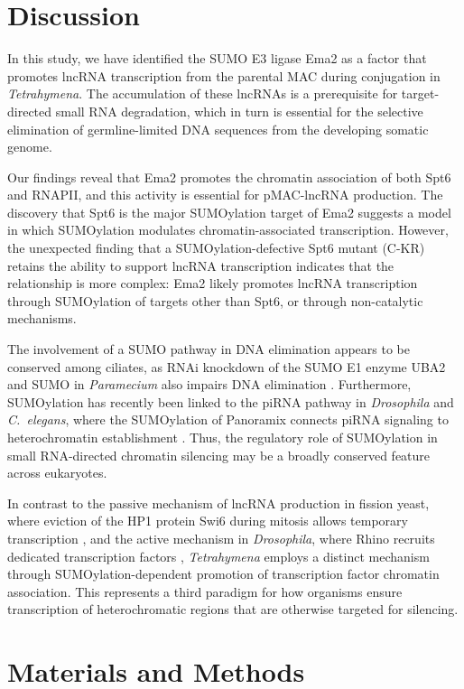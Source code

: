 \documentclass[11pt]{article}
\begin{document}
\section{Discussion}

In this study, we have identified the SUMO E3 ligase Ema2 as a factor that promotes lncRNA transcription from the parental MAC during conjugation in \textit{Tetrahymena}. The accumulation of these lncRNAs is a prerequisite for target-directed small RNA degradation, which in turn is essential for the selective elimination of germline-limited DNA sequences from the developing somatic genome.

Our findings reveal that Ema2 promotes the chromatin association of both Spt6 and RNAPII, and this activity is essential for pMAC-lncRNA production. The discovery that Spt6 is the major SUMOylation target of Ema2 suggests a model in which SUMOylation modulates chromatin-associated transcription. However, the unexpected finding that a SUMOylation-defective Spt6 mutant (C-KR) retains the ability to support lncRNA transcription indicates that the relationship is more complex: Ema2 likely promotes lncRNA transcription through SUMOylation of targets other than Spt6, or through non-catalytic mechanisms.

The involvement of a SUMO pathway in DNA elimination appears to be conserved among ciliates, as RNAi knockdown of the SUMO E1 enzyme UBA2 and SUMO in \textit{Paramecium} also impairs DNA elimination \citep{matsuda2006}. Furthermore, SUMOylation has recently been linked to the piRNA pathway in \textit{Drosophila} and \textit{C.\ elegans}, where the SUMOylation of Panoramix connects piRNA signaling to heterochromatin establishment \citep{zhao2022}. Thus, the regulatory role of SUMOylation in small RNA-directed chromatin silencing may be a broadly conserved feature across eukaryotes.

In contrast to the passive mechanism of lncRNA production in fission yeast, where eviction of the HP1 protein Swi6 during mitosis allows temporary transcription \citep{chen2008,kloc2008}, and the active mechanism in \textit{Drosophila}, where Rhino recruits dedicated transcription factors \citep{andersen2017}, \textit{Tetrahymena} employs a distinct mechanism through SUMOylation-dependent promotion of transcription factor chromatin association. This represents a third paradigm for how organisms ensure transcription of heterochromatic regions that are otherwise targeted for silencing.

\section{Materials and Methods}
\end{document}
